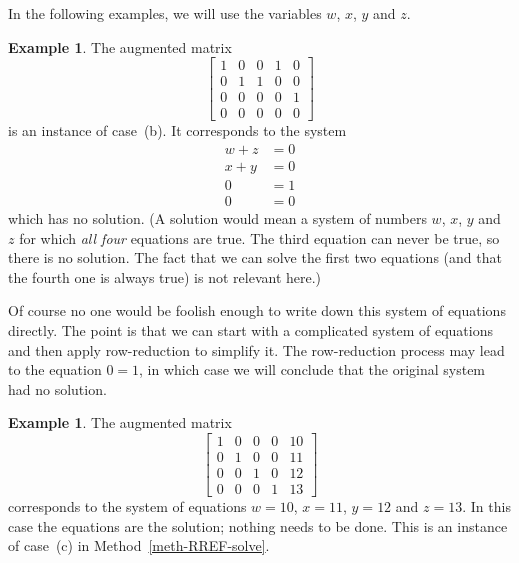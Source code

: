 \documentclass[reqno]{amsart}
\theoremstyle{definition}
\newtheorem{example}[theorem]{Example}
\begin{document}
In the following examples, we will use the variables $w$, $x$, $y$ and
$z$.
\begin{example}\label{eg-rref-solve-i}
 The augmented matrix
 \[ \left[\begin{array}{cccc|c}
     1 & 0 & 0 & 1 & 0 \\
     0 & 1 & 1 & 0 & 0 \\
     0 & 0 & 0 & 0 & 1 \\
     0 & 0 & 0 & 0 & 0
    \end{array}\right]
 \]
 is an instance of case~(b).  It corresponds to the system
 \begin{align*}
  w+z &= 0 \\
  x+y &= 0 \\
    0 &= 1 \\
    0 &= 0
 \end{align*}
 which has no solution.  (A solution would mean a system of numbers
 $w$, $x$, $y$ and $z$ for which \emph{all four} equations are true.  The
 third equation can never be true, so there is no solution.  The fact
 that we can solve the first two equations (and that the fourth one is
 always true) is not relevant here.)

 Of course no one would be foolish enough to write down this system of
 equations directly.  The point is that we can start with a
 complicated system of equations and then apply row-reduction to
 simplify it.  The row-reduction process may lead to the equation
 $0=1$, in which case we will conclude that the original system had no
 solution.
\end{example}

\begin{example}\label{eg-rref-solve-ii}
 The augmented matrix
 \[ \left[\begin{array}{cccc|c}
     1 & 0 & 0 & 0 & 10 \\
     0 & 1 & 0 & 0 & 11 \\
     0 & 0 & 1 & 0 & 12 \\
     0 & 0 & 0 & 1 & 13
    \end{array}\right]
 \]
 corresponds to the system of equations $w=10$, $x=11$, $y=12$ and
 $z=13$.  In this case the equations are the solution; nothing needs
 to be done.  This is an instance of case~(c) in
 Method~\ref{meth-RREF-solve}.
\end{example}
\end{document}
